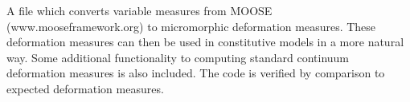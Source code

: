 A file which converts variable measures from MOOSE (www.mooseframework.org) to micromorphic deformation measures. These deformation measures can then be used in constitutive models in a more natural way. Some additional functionality to computing standard continuum deformation measures is also included. The code is verified by comparison to expected deformation measures.
